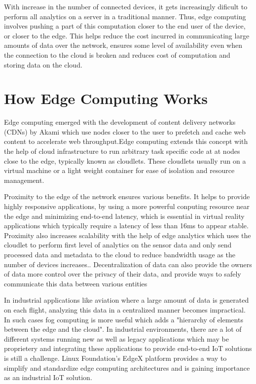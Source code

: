 \documentclass[sigconf]{acmart}
\begin{document}
With increase in the number of connected devices, it gets increasingly dificult to perform  all analytics on a server in a traditional manner. Thus, edge computing involves pushing a part of this computation closer to the end user of the device, or closer to the edge\cite{wiki-edge-computing}\cite{ibm_iot_edge}. This helps reduce the cost incurred in communicating large amounts of data over the network, ensures some level of availability even when the connection to the cloud is broken and reduces cost of computation and storing data on the cloud\cite{ieee_iot_cloud_analytics_newsletter}.

\section{How Edge Computing Works}
Edge computing emerged with the development of content delivery networks (CDNs) by Akami which use nodes closer to the user to prefetch and cache web content to accelerate web throughput.Edge computing extends this concept with the help of cloud infrastructure to run arbitrary task specific code at at nodes close to the edge, typically known as cloudlets. These cloudlets usually run on a virtual machine or a light weight container for ease of isolation and resource management.\cite{satyanarayananemergence}

Proximity to the edge of the network ensures various benefits. It helps to provide highly responsive applications, by using a more powerful conputing resource near the edge and minimizing end-to-end latency, which is essential in virtual reality applications which typically require a latency of less than 16ms to appear stable.\cite{rocket-real-time-video}\cite{satyanarayananemergence} Proximity also increases scalability with the help of edge analytics which uses the cloudlet to perform first level of analytics on the sensor data and only send processed data and metadata to the cloud to reduce bandwidth usage as the number of devices increases.\cite{satyanarayananemergence}.  Decentralization of data can also provide the owners of data more control over the privacy of their data, and provide ways to safely communicate this data between various entities\cite{ibm_iot_edge}

In industrial applications like aviation where a large amount of data is generated on each flight\cite{satyanarayananemergence}, analyzing this data in a centralized manner becomes impractical. In such cases fog computing is more useful which adds a "hierarchy of elements between the edge and the cloud"\cite{rt_insights_iiot}. In industrial environments, there are a lot of different systems running new as well as legacy applications which may be proprietery and integrating these applications to provide end-to-end IoT solutions is still a challenge. Linux Foundation's EdgeX platform provides a way to simplify and standardize edge computing architectures and is gaining importance as an industrial IoT solution.\cite{rt_insights_iiot}
\end{document}
